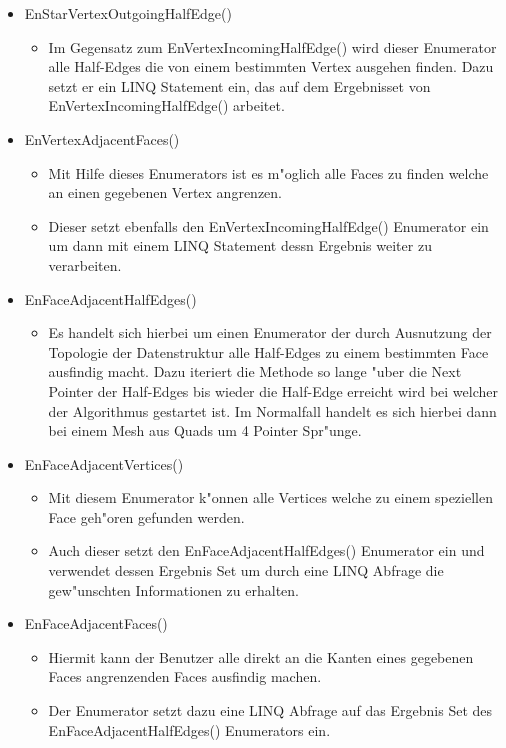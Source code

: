 \documentclass[pagesize, paper=a4, fontsize=12pt,titlepage=true, headings=small, headnosepline, abstractoff, liststotoc, nochapterprefix, plainheadsepline]{scrreprt}
\begin{document}
\begin{itemize}
\item EnStarVertexOutgoingHalfEdge()
	\begin{itemize}
	\item Im Gegensatz zum EnVertexIncomingHalfEdge() wird dieser Enumerator alle Half-Edges die von einem bestimmten Vertex ausgehen finden. Dazu setzt er ein LINQ Statement ein, das auf dem Ergebnisset von EnVertexIncomingHalfEdge() arbeitet.
	\end{itemize}
\item EnVertexAdjacentFaces()
	\begin{itemize}
	\item Mit Hilfe dieses Enumerators ist es m"oglich alle Faces zu finden welche an einen gegebenen Vertex angrenzen.
	\item Dieser setzt ebenfalls den EnVertexIncomingHalfEdge() Enumerator ein um dann mit einem LINQ Statement dessn Ergebnis weiter zu verarbeiten.
	\end{itemize}
\item EnFaceAdjacentHalfEdges()
	\begin{itemize}
	\item Es handelt sich hierbei um einen Enumerator der durch Ausnutzung der Topologie der Datenstruktur alle Half-Edges zu einem bestimmten Face ausfindig macht. Dazu iteriert die Methode so lange "uber die Next Pointer der Half-Edges bis wieder die Half-Edge erreicht wird bei welcher der Algorithmus gestartet ist. Im Normalfall handelt es sich hierbei dann bei einem Mesh aus Quads um 4 Pointer Spr"unge.
	\end{itemize}
\item EnFaceAdjacentVertices()
	\begin{itemize}
	\item Mit diesem Enumerator k"onnen alle Vertices welche zu einem speziellen Face geh"oren gefunden werden.
	\item Auch dieser setzt den EnFaceAdjacentHalfEdges() Enumerator ein und verwendet dessen Ergebnis Set um durch eine LINQ Abfrage die gew"unschten Informationen zu erhalten.
	\end{itemize}
\item EnFaceAdjacentFaces()
	\begin{itemize}
	\item Hiermit kann der Benutzer alle direkt an die Kanten eines gegebenen Faces angrenzenden Faces ausfindig machen.
	\item Der Enumerator setzt dazu eine LINQ Abfrage auf das Ergebnis Set des EnFaceAdjacentHalfEdges() Enumerators ein. 
	\end{itemize}
\end{itemize}
\end{document}
